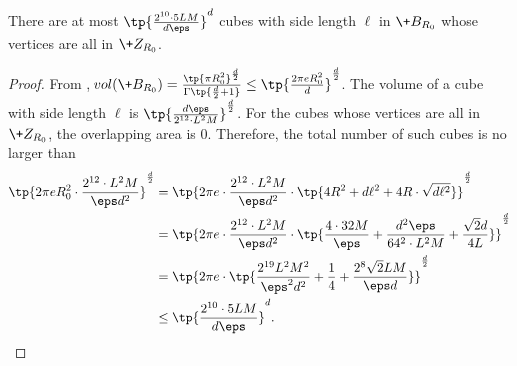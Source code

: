 \begin{lemma}\label{lem:cubes}
    There are at most $\tp{\frac{2^{10}\cdot 5 LM}{d\eps}}^{d}$ cubes with side length $\ell$ in $\+B_{R_0}$ whose vertices are all in $\+Z_{R_0}$. 
\end{lemma}
\begin{proof}
    From , $\!{vol}(\+B_{R_0}) = \frac{\tp{\pi R_0^2}^{\frac{d}{2}}}{\Gamma\tp{ \frac{d}{2}+1} } \leq \tp{\frac{2\pi e R_0^2}{d}}^{\frac{d}{2}}$. The volume of a cube with side length $\ell$ is $\tp{\frac{d\eps}{2^{12}\cdot L^2 M}}^{\frac{d}{2}}$. For the cubes whose vertices are all in $\+Z_{R_0}$, the overlapping area is $0$. Therefore, the total number of such cubes is no larger than 
    \begin{align*}
        \tp{2\pi e R_0^2 \cdot \frac{2^{12}\cdot L^2 M}{\eps d^2}}^{\frac{d}{2}} &= \tp{2\pi e \cdot \frac{2^{12}\cdot L^2 M}{\eps d^2}\cdot \tp{4R^2 + d\ell^2 + 4R\cdot \sqrt{d\ell^2}}}^{\frac{d}{2}}\\
        &= \tp{2\pi e \cdot \frac{2^{12}\cdot L^2 M}{\eps d^2}\cdot \tp{\frac{4\cdot 32 M}{\eps} + \frac{d^2\eps}{64^2\cdot L^2 M} + \frac{\sqrt{2}d}{4L}}}^{\frac{d}{2}}\\
        &= \tp{2\pi e \cdot \tp{\frac{2^{19}L^2 M^2}{\eps^2 d^2} + \frac{1}{4} + \frac{2^8\sqrt{2} LM}{\eps d}}}^{\frac{d}{2}}\\
        &\leq \tp{\frac{2^{10}\cdot 5 LM}{d\eps}}^{d}.
    \end{align*}
\end{proof}

